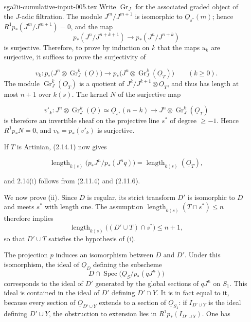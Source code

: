 \begin{filecontents*}{sga7ii-cumulative-input-005.tex}
Write $\operatorname{Gr}_J$ for the associated graded object of the $J$-adic
filtration.  The module $J^m/J^{m+1}$ is isomorphic to
$\underline{O}_{s^*}(m)$; hence $R^1p_*(J^m/J^{m+1})=0$, and the map
\[
p_*(J^n/J^{n+k+1})\longrightarrow p_*(J^n/J^{n+k})
\]
is surjective.  Therefore, to prove by induction on $k$ that the maps $u_k$ are
surjective, it suffices to prove the surjectivity of

\begin{equation*}
v_k:p_*\bigl(J^n\otimes\operatorname{Gr}_J^k(\underline{O})\bigr)
\longrightarrow
p_*\bigl(J^n\otimes\operatorname{Gr}_J^k(\underline{O}_T)\bigr)
\qquad(k\geq0).
\end{equation*}
The module $\operatorname{Gr}_J^k(\underline{O}_T)$ is a quotient of
$J^k/J^{k+1}\otimes\underline{O}_T$, and thus has length at most $n+1$ over
$k(s)$.  The kernel $N$ of the surjective map

\begin{equation*}
v'_k:J^n\otimes\operatorname{Gr}_J^k(\underline{O})
\simeq\underline{O}_{s^*}(n+k)
\longrightarrow
J^n\otimes\operatorname{Gr}_J^k(\underline{O}_T)
\end{equation*}
is therefore an invertible sheaf on the projective line $s^*$ of degree
$\geq-1$.  Hence $R^1p_*N=0$, and $v_k=p_*(v'_k)$ is surjective.

If $T$ is Artinian, (2.14.1) now gives

\begin{equation*}
\operatorname{length}_{k(s)}
\bigl(p_*J^n/p_*(J^nq)\bigr)
=\operatorname{length}_{k(s)}(\underline{O}_T),
\end{equation*}


and 2.14(i) follows from (2.11.4) and (2.11.6).

We now prove (ii).  Since $D$ is regular, its strict transform $D'$ is
isomorphic to $D$ and meets $s^*$ with length one.  The assumption
$\operatorname{length}_{k(s)}(T\cap s^*)\leq n$ therefore implies
\[
\operatorname{length}_{k(s)}\bigl((D'\cup T)\cap s^*\bigr)\leq n+1,
\]
so that $D'\cup T$ satisfies the hypothesis of (i).

The projection $p$ induces an isomorphism between $D$ and $D'$.  Under this
isomorphism, the ideal of $\underline{O}_D$ defining the subscheme
\[
D\cap\operatorname{Spec}\bigl(\underline{O}_S/p_*(qJ^n)\bigr)
\]
corresponds to the ideal of $D'$ generated by the global sections of $qJ^n$ on
$S_1$.  This ideal is contained in the ideal of $D'$ defining $D'\cap Y$.
It is in fact equal to it, because every section of
$\underline{O}_{D'\cup Y}$ extends to a section of $\underline{O}_{S_1}$:
if $I_{D'\cup Y}$ is the ideal defining $D'\cup Y$, the obstruction to
extension lies in $R^1p_*(I_{D'\cup Y})$.  One has


\end{filecontents*}
